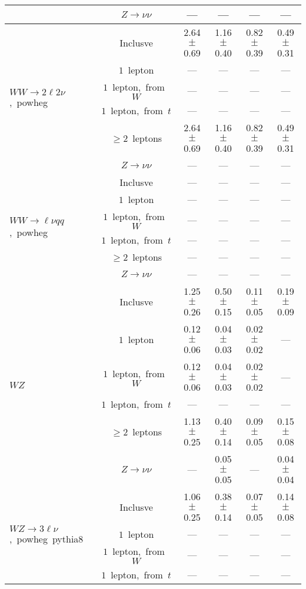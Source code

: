 \documentclass{article}
\begin{document}
\begin{longtable}{|l|c|c|c|c|c|}
 & $Z\rightarrow\nu\nu$  & ---  & ---  & ---  & --- \\* 
\hline 
\multirow{6}{*}{$WW{\rightarrow}2\ell2\nu$,~powheg} & Inclusve  & 2.64 $\pm$ 0.69  & 1.16 $\pm$ 0.40  & 0.82 $\pm$ 0.39  & 0.49 $\pm$ 0.31 \\* 
 & $1$~lepton  & ---  & ---  & ---  & --- \\* 
 & $1$~lepton,~from~$W$  & ---  & ---  & ---  & --- \\* 
 & $1$~lepton,~from~$t$  & ---  & ---  & ---  & --- \\* 
 & $\ge2$~leptons  & 2.64 $\pm$ 0.69  & 1.16 $\pm$ 0.40  & 0.82 $\pm$ 0.39  & 0.49 $\pm$ 0.31 \\* 
 & $Z\rightarrow\nu\nu$  & ---  & ---  & ---  & --- \\* 
\hline 
\multirow{6}{*}{$WW{\rightarrow}{\ell}{\nu}qq$,~powheg} & Inclusve  & ---  & ---  & ---  & --- \\* 
 & $1$~lepton  & ---  & ---  & ---  & --- \\* 
 & $1$~lepton,~from~$W$  & ---  & ---  & ---  & --- \\* 
 & $1$~lepton,~from~$t$  & ---  & ---  & ---  & --- \\* 
 & $\ge2$~leptons  & ---  & ---  & ---  & --- \\* 
 & $Z\rightarrow\nu\nu$  & ---  & ---  & ---  & --- \\* 
\hline 
\multirow{6}{*}{$WZ$} & Inclusve  & 1.25 $\pm$ 0.26  & 0.50 $\pm$ 0.15  & 0.11 $\pm$ 0.05  & 0.19 $\pm$ 0.09 \\* 
 & $1$~lepton  & 0.12 $\pm$ 0.06  & 0.04 $\pm$ 0.03  & 0.02 $\pm$ 0.02  & --- \\* 
 & $1$~lepton,~from~$W$  & 0.12 $\pm$ 0.06  & 0.04 $\pm$ 0.03  & 0.02 $\pm$ 0.02  & --- \\* 
 & $1$~lepton,~from~$t$  & ---  & ---  & ---  & --- \\* 
 & $\ge2$~leptons  & 1.13 $\pm$ 0.25  & 0.40 $\pm$ 0.14  & 0.09 $\pm$ 0.05  & 0.15 $\pm$ 0.08 \\* 
 & $Z\rightarrow\nu\nu$  & ---  & 0.05 $\pm$ 0.05  & ---  & 0.04 $\pm$ 0.04 \\* 
\hline 
\multirow{6}{*}{$WZ{\rightarrow}3\ell\nu$,~powheg~pythia8} & Inclusve  & 1.06 $\pm$ 0.25  & 0.38 $\pm$ 0.14  & 0.07 $\pm$ 0.05  & 0.14 $\pm$ 0.08 \\* 
 & $1$~lepton  & ---  & ---  & ---  & --- \\* 
 & $1$~lepton,~from~$W$  & ---  & ---  & ---  & --- \\* 
 & $1$~lepton,~from~$t$  & ---  & ---  & ---  & --- \\* 

\end{longtable}
\end{document}
